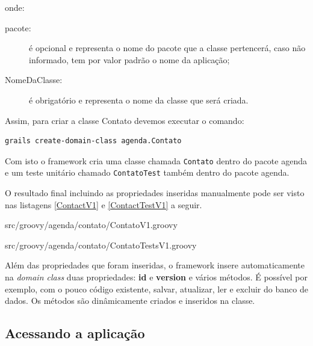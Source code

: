 \documentclass[12pt]{article}
\begin{document}
    onde:
    
    \begin{description}
        \item[pacote:] é opcional e representa o nome do pacote que a classe 
                      pertencerá, caso não informado, tem por valor padrão o nome
                      da aplicação;
        \item[NomeDaClasse:] é obrigatório e representa o nome da classe que será
                             criada.
    \end{description}
    
    Assim, para criar a classe Contato devemos executar o comando:
    
    \begin{lstlisting}[basicstyle={\small \ttfamily}]
        grails create-domain-class agenda.Contato
    \end{lstlisting}
    
    Com isto o framework cria uma classe chamada \texttt{Contato} dentro do pacote agenda 
    e um teste unitário chamado \texttt{ContatoTest} também dentro do pacote agenda.
    
    O resultado final incluindo as propriedades inseridas manualmente pode ser visto
    nas listagens \ref{ContactV1} e \ref{ContactTestV1} a seguir.
    
    
                    {src/groovy/agenda/contato/ContatoV1.groovy}

   
                    {src/groovy/agenda/contato/ContatoTestsV1.groovy}

    Além das propriedades que foram inseridas, o framework insere automaticamente
    na \emph{domain class} duas propriedades: \textbf{id} e \textbf{version} e vários métodos.
    É possível por exemplo, com o pouco código existente, salvar, atualizar, ler
    e excluir do banco de dados. Os métodos são dinâmicamente criados e inseridos
    na classe.

\subsection{Acessando a aplicação}
\end{document}
